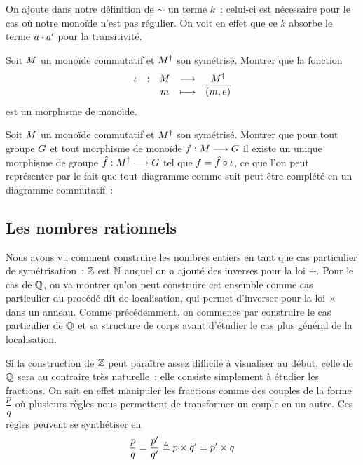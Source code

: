 \begin{remark}
  On ajoute dans notre définition de $\sim$ un terme $k$~: celui-ci est
  nécessaire pour le cas où notre monoïde n'est pas régulier. On voit en effet
  que ce $k$ absorbe le terme $a \mathbin{\cdot} a'$ pour la transitivité.
\end{remark}

\begin{exercise}
  Soit $M$ un monoïde commutatif et $M^\dagger$ son symétrisé.
  Montrer que la fonction
  \[
  \makeFun{\iota}{\varMMo}{\varMMo^\dagger}{m}{\clas{(m,e)}}
  \]
  est un morphisme de monoïde.
\end{exercise}

\begin{exercise}
  Soit $M$ un monoïde commutatif et $M^\dagger$ son symétrisé.
  Montrer que pour tout groupe $G$ et tout morphisme de monoïde
  $f : \displaystyle M \longrightarrow G$ il existe un unique
  morphisme de groupe $\hat{f} : \displaystyle M^\dagger \longrightarrow G$ tel que
  $f = \hat{f} \circ \iota$, ce
  que l'on peut représenter par le fait que tout diagramme comme suit peut être
  complété en un diagramme commutatif~:
  \begin{center}
  \end{center}
\end{exercise}

\subsection{Les nombres rationnels}

Nous avons vu comment construire les nombres entiers en tant que cas particulier
de symétrisation~: $\mathbb Z$ est $\mathbb N$ auquel on a ajouté des inverses pour la loi
$+$. Pour le cas de $\mathbb Q$, on va montrer qu'on peut construire cet ensemble
comme cas particulier du procédé dit de localisation, qui permet d'inverser pour
la loi $\times$ dans un anneau. Comme précédemment, on commence par construire
le cas particulier de $\mathbb Q$ et sa structure de corps avant d'étudier le cas plus
général de la localisation.

Si la construction de $\mathbb Z$ peut paraître assez difficile à visualiser au début,
celle de $\mathbb Q$ sera au contraire très naturelle~: elle consiste simplement à
étudier les fractions. On sait en effet manipuler les fractions comme des
\og couples\fg{} de la forme $\dfrac{p}{q}$ où plusieurs règles nous permettent
de transformer un couple en un autre. Ces règles peuvent se synthétiser en
\[\frac{p}{q} = \frac{p'}{q'} \triangleq p\times q' = p' \times q\]

